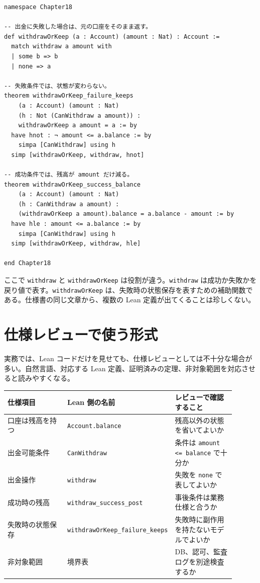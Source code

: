 \begin{listing}[htbp]
\begin{verbatim}
namespace Chapter18

-- 出金に失敗した場合は、元の口座をそのまま返す。
def withdrawOrKeep (a : Account) (amount : Nat) : Account :=
  match withdraw a amount with
  | some b => b
  | none => a

-- 失敗条件では、状態が変わらない。
theorem withdrawOrKeep_failure_keeps
    (a : Account) (amount : Nat)
    (h : Not (CanWithdraw a amount)) :
    withdrawOrKeep a amount = a := by
  have hnot : ¬ amount <= a.balance := by
    simpa [CanWithdraw] using h
  simp [withdrawOrKeep, withdraw, hnot]

-- 成功条件では、残高が amount だけ減る。
theorem withdrawOrKeep_success_balance
    (a : Account) (amount : Nat)
    (h : CanWithdraw a amount) :
    (withdrawOrKeep a amount).balance = a.balance - amount := by
  have hle : amount <= a.balance := by
    simpa [CanWithdraw] using h
  simp [withdrawOrKeep, withdraw, hle]

end Chapter18
\end{verbatim}
\caption{失敗時に状態を保つ wrapper}
\label{lst:ch18-withdraw-or-keep}
\end{listing}

ここで \texttt{withdraw} と \texttt{withdrawOrKeep} は役割が違う。\texttt{withdraw} は成功か失敗かを戻り値で表す。\texttt{withdrawOrKeep} は、失敗時の状態保存を表すための補助関数である。仕様書の同じ文章から、複数の Lean 定義が出てくることは珍しくない。

\section{仕様レビューで使う形式}

実務では、Lean コードだけを見せても、仕様レビューとしては不十分な場合が多い。自然言語、対応する Lean 定義、証明済みの定理、非対象範囲を対応させると読みやすくなる。

\begin{center}
\begin{tabular}{p{0.32\linewidth}p{0.28\linewidth}p{0.30\linewidth}}
\toprule
仕様項目 & Lean 側の名前 & レビューで確認すること \\
\midrule
口座は残高を持つ & \texttt{Account.balance} & 残高以外の状態を省いてよいか \\
出金可能条件 & \texttt{CanWithdraw} & 条件は \texttt{amount <= balance} で十分か \\
出金操作 & \texttt{withdraw} & 失敗を \texttt{none} で表してよいか \\
成功時の残高 & \texttt{withdraw\_success\_post} & 事後条件は業務仕様と合うか \\
失敗時の状態保存 & \texttt{withdrawOrKeep\_failure\_keeps} & 失敗時に副作用を持たないモデルでよいか \\
非対象範囲 & 境界表 & DB、認可、監査ログを別途検査するか \\
\bottomrule
\end{tabular}
\end{center}

